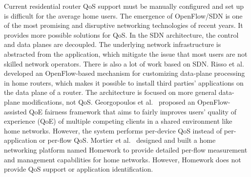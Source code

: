 Current residential router QoS support must be manually configured and set up is difficult for the average home users. The emergence of OpenFlow/SDN is one of the most promising and disruptive networking technologies of recent years. It provides more possible solutions for QoS. In the SDN architecture, the control and data planes are decoupled. The underlying network infrastructure is abstracted from the application, which mitigate the issue that most users are not skilled network operators. There is also a lot of work based on SDN. Risso et al.~\cite{risso2012customizing} developed an OpenFlow-based mechanism for customizing data-plane processing in home routers, which makes it possible to install third parties' applications on the data plane of a router. The architecture is focused on more general data-plane modifications, not QoS. Georgopoulos et al.~\cite{georgopoulos2013towards} proposed an OpenFlow-assisted QoE fairness framework that aims to fairly improves users’ quality of experience (QoE) of multiple competing clients in a shared environment like home networks. However, the system performs per-device QoS instead of per-application or per-flow QoS. Mortier et al.~\cite{mortier2011supporting} designed and built a home networking platform named Homework to provide detailed per-flow measurement and management capabilities for home networks. However, Homework does not provide QoS support or application identification. 
